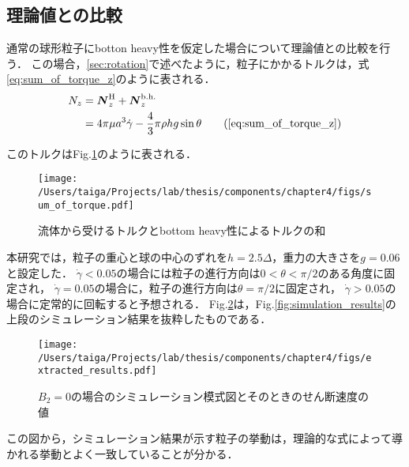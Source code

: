 \subsection{理論値との比較}
通常の球形粒子にbotton heavy性を仮定した場合について理論値との比較を行う．
この場合，\ref{sec:rotation}で述べたように，粒子にかかるトルクは，式\eqref{eq:sum_of_torque_z}のように表される．
    \begin{align}
        N_z &= \boldsymbol{N}^\mathrm{H}_z + \boldsymbol{N}^\mathrm{b.h.}_z \notag \\
            &= 4 \pi \mu a^3 \dot{\gamma} - \frac{4}{3} \pi \rho h g \sin \theta
        \tag{\ref{eq:sum_of_torque_z}}
    \end{align}

\noindent
このトルクはFig.\ref{fig:sum_of_torque}のように表される．

    \begin{figure}[H]
        \centering
        \texttt{[image: /Users/taiga/Projects/lab/thesis/components/chapter4/figs/sum\_of\_torque.pdf]}
        \caption{流体から受けるトルクとbottom heavy性によるトルクの和}
        \label{fig:sum_of_torque}
    \end{figure}

\noindent
本研究では，粒子の重心と球の中心のずれを$h = 2.5 \Delta$，重力の大きさを$g = 0.06$と設定した．
$\dot{\gamma} < 0.05$の場合には粒子の進行方向は$0 < \theta < \pi / 2$のある角度に固定され，
$\dot{\gamma} = 0.05$の場合に，粒子の進行方向は$\theta = \pi /2$に固定され，
$\dot{\gamma} > 0.05$の場合に定常的に回転すると予想される．
Fig.\ref{fig:extracted_results}は，Fig.\ref{fig:simulation_results}の上段のシミュレーション結果を抜粋したものである．

    \begin{figure}[htbp]
        \centering
        \texttt{[image: /Users/taiga/Projects/lab/thesis/components/chapter4/figs/extracted\_results.pdf]}
        \caption{$B_2 = 0$の場合のシミュレーション模式図とそのときのせん断速度の値}
        \label{fig:extracted_results}
    \end{figure}

\noindent
この図から，シミュレーション結果が示す粒子の挙動は，理論的な式によって導かれる挙動とよく一致していることが分かる．
